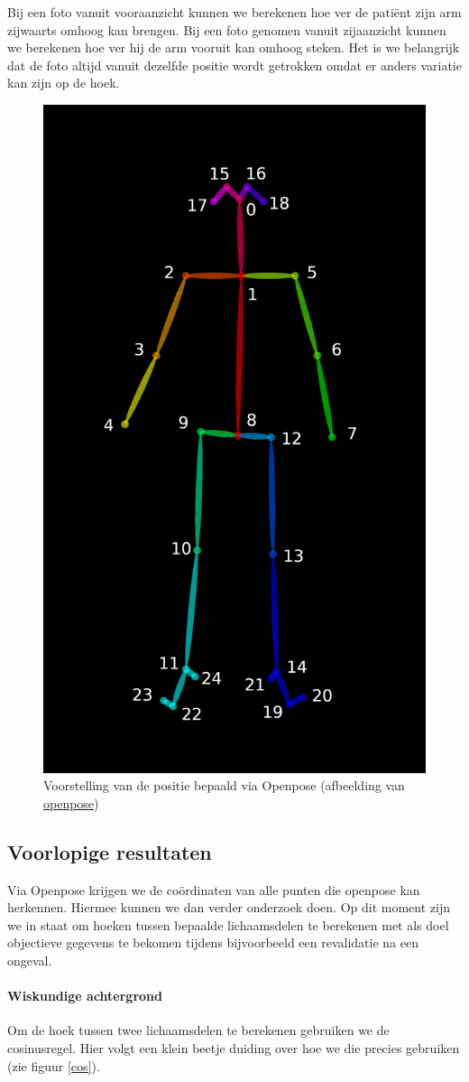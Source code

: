 \documentclass[a4paper,twoside,kulak]{kulakreport}
\begin{document}
Bij een foto vanuit vooraanzicht kunnen we berekenen hoe ver de patiënt zijn arm zijwaarts omhoog kan brengen. Bij een foto genomen vanuit zijaanzicht kunnen we berekenen hoe ver hij de arm vooruit kan omhoog steken. Het is we belangrijk dat de foto altijd vanuit dezelfde positie wordt getrokken omdat er anders variatie kan zijn op de hoek.



\begin{figure}[H]
	\centering
	\includegraphics[width=.5\textwidth]{HPE_skelet}
	\caption{Voorstelling van de positie bepaald via Openpose (afbeelding van \href{https://github.com/CMU-Perceptual-Computing-Lab/openpose/blob/master/doc/output.md}{openpose})}
	\label{fig:skelet}
\end{figure}


\subsection{Voorlopige resultaten}

Via Openpose krijgen we de coördinaten van alle punten die openpose kan herkennen. Hiermee kunnen we dan verder onderzoek doen. Op dit moment zijn we in staat om hoeken tussen bepaalde lichaamsdelen te berekenen met als doel objectieve gegevens te bekomen tijdens bijvoorbeeld een revalidatie na een ongeval.

\paragraph{Wiskundige achtergrond}
Om de hoek tussen twee lichaamsdelen te berekenen gebruiken we de cosinusregel. Hier volgt een klein beetje duiding over hoe we die precies gebruiken (zie figuur \ref{cos}).\\
\end{document}

